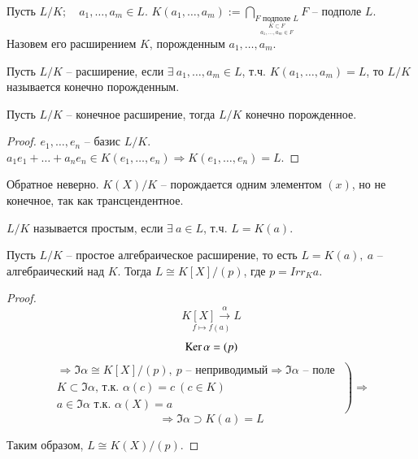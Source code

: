 \documentclass[main]{subfiles}
\begin{document}
\begin{definition}
    Пусть $L / K ; \quad a_1, \ldots, a_m \in L$. 
    $K(a_1, \ldots, a_m) := \bigcap_{\underset{a_1, \ldots, a_m \in F}{\underset{K \subset F}{F \text{ подполе } L}}} F
    \text{ -- подполе } L$.
    Назовем его расширением $K$, порожденным $a_1, \ldots, a_m$.
\end{definition}

\begin{definition}
    Пусть $L / K$ -- расширение, если $\exists \ a_1, \ldots, a_m \in L$, т.ч.
    $K(a_1, \ldots, a_m) = L$, то $L / K $ называется конечно порожденным.
\end{definition}

\begin{proposition}
    Пусть $L / K$ -- конечное  расширение, тогда $L / K$ конечно порожденное.
\end{proposition}

\begin{proof}
    $e_1, \ldots , e_n$ -- базис $L/K$. $a_1e_1 + \ldots + a_ne_n \in  K(e_1, \ldots, e_n)  \Rightarrow K(e_1, \ldots, e_n) = L$.
\end{proof}

\begin{remark}
    Обратное неверно. $K(X) / K$ -- порождается одним элементом $(x)$, но не конечное, так как трансцендентное.
\end{remark}

\begin{definition}
    $L / K$ называется простым, если $\exists \ a \in L$, т.ч. $L = K(a)$.
\end{definition}

\begin{proposition}
    Пусть $L / K$ -- простое алгебраическое расширение, то есть $L = K(a), \ a$ -- алгебраический над $K$.
    Тогда $L \cong K[X] / (p)$, где $p = Irr_K a$.
\end{proposition}

\begin{proof}
    \[ \underset{f \mapsto f(a)}{K[X] \stackrel{\alpha}{\longrightarrow}L}  \]
    \[ \operatorname{Ker} \alpha = (p) \] 
    \[  \left. \begin{gathered}
        \Rightarrow \Im \alpha \cong K[X] / (p), \ p \text{ -- неприводимый} \Rightarrow \Im \alpha \text{ -- поле } \\
        K \subset \Im \alpha \text{, т.к. } \alpha(c) = c \ (c \in K) \\
        a \in \Im \alpha \text{ т.к. } \alpha(X) = a
    \end{gathered} \right) \Rightarrow \]
    \[\Rightarrow \Im \alpha \supset K(a) = L \]
    
   Таким образом, $L \cong K(X)  / (p)$.
\end{proof}
\end{document}
